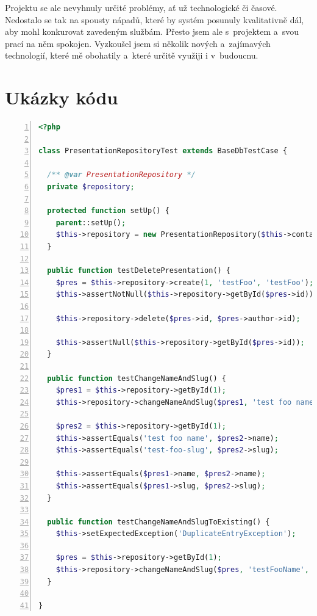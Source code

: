 \documentclass[11pt,twoside,a4paper]{book}
\begin{document}
Projektu se ale nevyhnuly určité problémy, ať už technologické či časové. Nedostalo se tak na spousty nápadů, které by systém posunuly kvalitativně dál, aby mohl konkurovat zavedeným službám. Přesto jsem ale s~projektem a~svou prací na něm spokojen. Vyzkoušel jsem si několik nových a~zajímavých technologií, které mě obohatily a~které určitě využiji i v~budoucnu.





{
\def\CS{$\cal C\kern-0.1667em\lower.5ex\hbox{$\cal S$}\kern-0.075em $}

}




\appendix	

\printnomenclature

\chapter{Ukázky kódu}\label{chap:ukazkykodu}


\begin{lstlisting}[caption={Ukázka integračních testů},label={lst:integrationtest},
language=php,
numbers=left,
breaklines=true]
<?php

class PresentationRepositoryTest extends BaseDbTestCase {

  /** @var PresentationRepository */
  private $repository;

  protected function setUp() {
    parent::setUp();
    $this->repository = new PresentationRepository($this->container->database);
  }

  public function testDeletePresentation() {
    $pres = $this->repository->create(1, 'testFoo', 'testFoo');
    $this->assertNotNull($this->repository->getById($pres->id));

    $this->repository->delete($pres->id, $pres->author->id);

    $this->assertNull($this->repository->getById($pres->id));
  }

  public function testChangeNameAndSlug() {
    $pres1 = $this->repository->getById(1);
    $this->repository->changeNameAndSlug($pres1, 'test foo name', 'test foo slug');

    $pres2 = $this->repository->getById(1);
    $this->assertEquals('test foo name', $pres2->name);
    $this->assertEquals('test-foo-slug', $pres2->slug);

    $this->assertEquals($pres1->name, $pres2->name);
    $this->assertEquals($pres1->slug, $pres2->slug);
  }

  public function testChangeNameAndSlugToExisting() {
    $this->setExpectedException('DuplicateEntryException');

    $pres = $this->repository->getById(1);
    $this->repository->changeNameAndSlug($pres, 'testFooName', 'test2');
  }

}
\end{lstlisting}
\end{document}

